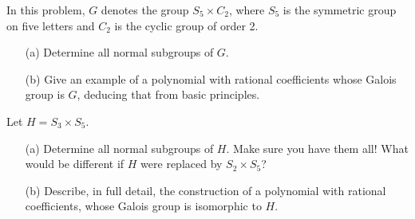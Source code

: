 \begin{prob}[S2012-Q3]
    In this problem, \(G\) denotes the group \(S_5 \times C_2\), where \(S_5\) is the symmetric group on five letters and \(C_2\) is the cyclic group of order 2.
    \begin{itemize}
        \item[(a)] Determine all normal subgroups of \(G\).
        \item[(b)] Give an example of a polynomial with rational coefficients whose Galois group is \(G\), deducing that from basic principles.
    \end{itemize}
\end{prob}


\begin{prob}[F2015-Q4]
    Let \(H = S_3 \times S_5\).
    \begin{itemize}
        \item[(a)] Determine all normal subgroups of \(H\). Make sure you have them all! What would be different if \(H\) were replaced by \(S_2 \times S_5\)?
        \item[(b)] Describe, in full detail, the construction of a polynomial with rational coefficients, whose Galois group is isomorphic to \(H\).
    \end{itemize}
\end{prob}






